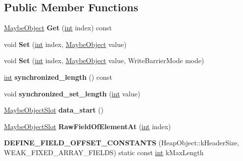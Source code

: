 \subsection*{Public Member Functions}
\begin{DoxyCompactItemize}
\item 
\mbox{\label{classv8_1_1internal_1_1WeakFixedArray_a7bcbd4d6f7da9aa040f496328f675d98}} 
\mbox{\hyperlink{classv8_1_1internal_1_1MaybeObject}{Maybe\+Object}} {\bfseries Get} (\mbox{\hyperlink{classint}{int}} index) const
\item 
\mbox{\label{classv8_1_1internal_1_1WeakFixedArray_a223ea34cb2d46c9262a38651d1155f69}} 
void {\bfseries Set} (\mbox{\hyperlink{classint}{int}} index, \mbox{\hyperlink{classv8_1_1internal_1_1MaybeObject}{Maybe\+Object}} value)
\item 
\mbox{\label{classv8_1_1internal_1_1WeakFixedArray_aceeb07aa201252c80c701a208c644591}} 
void {\bfseries Set} (\mbox{\hyperlink{classint}{int}} index, \mbox{\hyperlink{classv8_1_1internal_1_1MaybeObject}{Maybe\+Object}} value, Write\+Barrier\+Mode mode)
\item 
\mbox{\label{classv8_1_1internal_1_1WeakFixedArray_a2558307d0ea3bb876c2a7594aa82e25b}} 
\mbox{\hyperlink{classint}{int}} {\bfseries synchronized\+\_\+length} () const
\item 
\mbox{\label{classv8_1_1internal_1_1WeakFixedArray_aac8764ec564625c8799f39b1d7505475}} 
void {\bfseries synchronized\+\_\+set\+\_\+length} (\mbox{\hyperlink{classint}{int}} value)
\item 
\mbox{\label{classv8_1_1internal_1_1WeakFixedArray_a31f86f280ced6096edd35b3416e02c7d}} 
\mbox{\hyperlink{classv8_1_1internal_1_1MaybeObjectSlot}{Maybe\+Object\+Slot}} {\bfseries data\+\_\+start} ()
\item 
\mbox{\label{classv8_1_1internal_1_1WeakFixedArray_a6e64f5351f2e3b5049b1845ad255ab41}} 
\mbox{\hyperlink{classv8_1_1internal_1_1MaybeObjectSlot}{Maybe\+Object\+Slot}} {\bfseries Raw\+Field\+Of\+Element\+At} (\mbox{\hyperlink{classint}{int}} index)
\item 
\mbox{\label{classv8_1_1internal_1_1WeakFixedArray_acbd0300703fb7b1c64d88988bf81265d}} 
{\bfseries D\+E\+F\+I\+N\+E\+\_\+\+F\+I\+E\+L\+D\+\_\+\+O\+F\+F\+S\+E\+T\+\_\+\+C\+O\+N\+S\+T\+A\+N\+TS} (Heap\+Object\+::k\+Header\+Size, W\+E\+A\+K\+\_\+\+F\+I\+X\+E\+D\+\_\+\+A\+R\+R\+A\+Y\+\_\+\+F\+I\+E\+L\+DS) static const \mbox{\hyperlink{classint}{int}} k\+Max\+Length
\end{DoxyCompactItemize}
